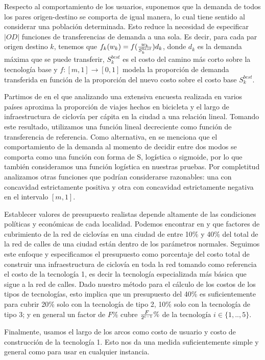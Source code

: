 \documentclass{article}
\begin{document}
  Respecto al comportamiento de los usuarios, suponemos que la demanda de todos los pares origen-destino se comporta de igual manera, lo cual tiene sentido al considerar una población determinada. Esto reduce la necesidad de especificar $|OD|$ funciones de transferencias de demanda a una sola. Es decir, para cada par origen destino $k$, tenemos que $f_k(w_k) = f({w_k \over S^{best}_k})d_k$, donde $d_k$ es la demanda máxima que se puede transferir, $S^{best}_k$ es el costo del camino más corto sobre la tecnología base y $f: [m, 1] \rightarrow [0, 1]$ modela la proporción de demanda transferida en función de la proporción del nuevo costo sobre el costo base $S^{best}_k$.

  Partimos de \cite{shwe2014} en el que analizando una extensiva encuesta realizada en varios países aproxima la proporción de viajes hechos en bicicleta y el largo de infraestructura de ciclovía per cápita en la ciudad a una relación lineal. Tomando este resultado, utilizamos una función lineal decreciente como función de transferencia de referencia. Como alternativa, en \cite{ortuz2011} se menciona que el comportamiento de la demanda al momento de decidir entre dos modos se comporta como una función con forma de S, logística o sigmoide, por lo que también consideramos una función logística en nuestras pruebas. Por completitud analizamos otras funciones que podrían considerarse razonables: una con concavidad estrictamente positiva y otra con concavidad estrictamente negativa en el intervalo $[m, 1]$.

  Establecer valores de presupuesto realistas depende altamente de las condiciones políticas y económicas de cada localidad. Podemos encontrar en \cite{rios2015} y \cite{shwe2014} que factores de cubrimiento de la red de ciclovías en una ciudad de entre 10\% y 40\% del total de la red de calles de una ciudad están dentro de los parámetros normales. Seguimos este enfoque y especificamos el presupuesto como porcentaje del costo total de construir una infraestructura de ciclovía en toda la red tomando como referencia el costo de la tecnología 1, es decir la tecnología especializada más básica que sigue a la red de calles. Dado nuestro método para el cálculo de los costos de los tipos de tecnologías, esto implica que un presupuesto del 40\% es suficientemente para cubrir 20\% solo con la tecnología de tipo 2, 10\% solo con la tecnología de tipo 3; y en general un factor de $F\%$ cubre ${F \over {2^{i - 1}}}\%$ de la tecnología $i \in \{1,..,5\}$.

  Finalmente, usamos el largo de los arcos como costo de usuario y costo de construcción de la tecnología 1. Esto nos da una medida suficientemente simple y general como para usar en cualquier instancia.
\end{document}
